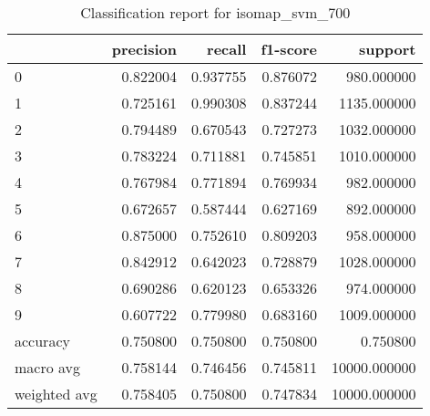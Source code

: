 \begin{table}[htb!]
\centering
\caption{Classification report for isomap_svm_700}
\label{tab:classification-report-isomap_svm_700}
\begin{tabular}{lrrrr}
\toprule
 & precision & recall & f1-score & support \\
\midrule
0 & 0.822004 & 0.937755 & 0.876072 & 980.000000 \\
1 & 0.725161 & 0.990308 & 0.837244 & 1135.000000 \\
2 & 0.794489 & 0.670543 & 0.727273 & 1032.000000 \\
3 & 0.783224 & 0.711881 & 0.745851 & 1010.000000 \\
4 & 0.767984 & 0.771894 & 0.769934 & 982.000000 \\
5 & 0.672657 & 0.587444 & 0.627169 & 892.000000 \\
6 & 0.875000 & 0.752610 & 0.809203 & 958.000000 \\
7 & 0.842912 & 0.642023 & 0.728879 & 1028.000000 \\
8 & 0.690286 & 0.620123 & 0.653326 & 974.000000 \\
9 & 0.607722 & 0.779980 & 0.683160 & 1009.000000 \\
accuracy & 0.750800 & 0.750800 & 0.750800 & 0.750800 \\
macro avg & 0.758144 & 0.746456 & 0.745811 & 10000.000000 \\
weighted avg & 0.758405 & 0.750800 & 0.747834 & 10000.000000 \\
\bottomrule
\end{tabular}
\end{table}
